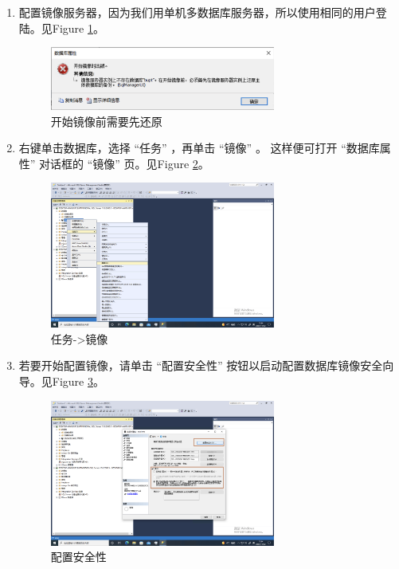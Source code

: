 \documentclass[onecolumn,oneside]{BUPTHomework}
\begin{document}
  \begin{enumerate}
    \item 配置镜像服务器，因为我们用单机多数据库服务器，所以使用相同的用户登陆。见Figure \ref{pic8}。
    
    \begin{figure}[h]
      \centering
      \includegraphics[width=0.70\textwidth]{image/pic8.png}
      \caption{开始镜像前需要先还原}
      \label{pic8}
    \end{figure}

    \item 右键单击数据库，选择 “任务” ，再单击 “镜像” 。 这样便可打开 “数据库属性” 对话框的 “镜像” 页。见Figure \ref{pic9}。
    
    \begin{figure}[h]
      \centering
      \includegraphics[width=0.70\textwidth]{image/pic9.png}
      \caption{任务->镜像}
      \label{pic9}
    \end{figure}

    \item 若要开始配置镜像，请单击 “配置安全性” 按钮以启动配置数据库镜像安全向导。见Figure \ref{pic10}。
    
    \newpage
    
    \begin{figure}[h]
      \centering
      \includegraphics[width=0.70\textwidth]{image/pic10.png}
      \caption{配置安全性}
      \label{pic10}
    \end{figure}


\end{enumerate}
\end{document}
